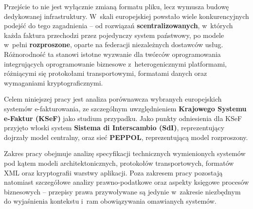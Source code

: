 Przejście to nie jest wyłącznie zmianą formatu pliku, lecz wymusza budowę dedykowanej infrastruktury. W~skali europejskiej powstało wiele konkurencyjnych podejść do tego zagadnienia -- od rozwiązań \textbf{scentralizowanych}, w~których każda faktura przechodzi przez pojedynczy system państwowy, po modele w~pełni \textbf{rozproszone}, oparte na federacji niezależnych dostawców usług. Różnorodność ta stanowi istotne wyzwanie dla twórców oprogramowania integrujących oprogramowanie biznesowe z~heterogenicznymi platformami, różniącymi się protokołami transportowymi, formatami danych oraz wymaganiami kryptograficznymi.

Celem niniejszej pracy jest analiza porównawcza wybranych europejskich systemów e-fakturowania, ze szczególnym uwzględnieniem \textbf{Krajowego Systemu e-Faktur (KSeF)} jako studium przypadku. Jako punkty odniesienia dla KSeF przyjęto włoski system \textbf{Sistema di Interscambio (SdI)}, reprezentujący dojrzały model centralny, oraz sieć \textbf{PEPPOL}, reprezentującą model rozproszony.

Zakres pracy obejmuje analizę specyfikacji technicznych wymienionych systemów pod kątem modeli architektonicznych, protokołów transportowych, formatów XML oraz kryptografii warstwy aplikacji. Poza zakresem pracy pozostają natomiast szczegółowe analizy prawno-podatkowe oraz aspekty księgowe procesów biznesowych -- przepisy prawa przywoływane są jedynie w~zakresie niezbędnym do wyjaśnienia kontekstu i~ram obowiązywania omawianych systemów.
